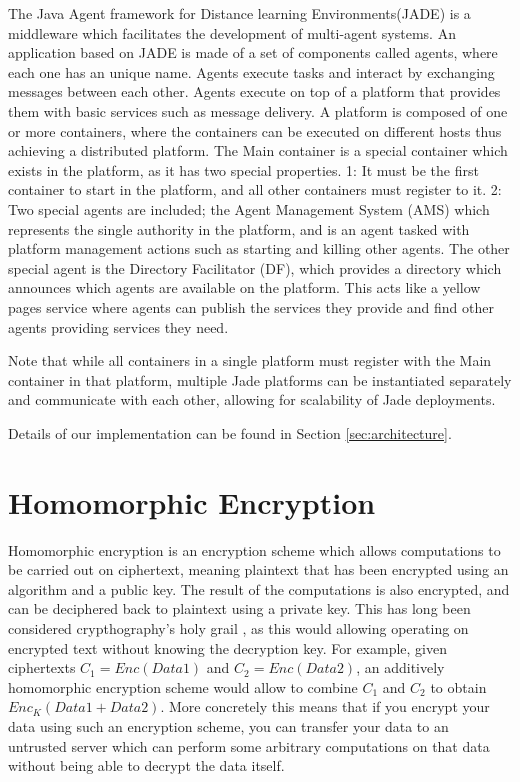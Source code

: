 The Java Agent framework for Distance learning Environments(JADE) is a middleware which facilitates the development of multi-agent systems. An application based on JADE is made of a set of components called agents, where each one has an unique name. Agents execute tasks and interact by exchanging messages between each other. Agents execute on top of a platform that provides them with basic services such as message delivery. A platform is composed of one or more containers, where the containers can be executed on different hosts thus achieving a distributed platform. The Main container is a special container which exists in the platform, as it has two special properties. 1: It must be the first container to start in the platform, and all other containers must register to it. 2: Two special agents are included; the Agent Management System (AMS) which represents the single authority in the platform, and is an agent tasked with platform management actions such as starting and killing other agents. The other special agent is the Directory Facilitator (DF), which provides a directory which announces which agents are available on the platform. This acts like a yellow pages service where agents can publish the services they provide and find other agents providing services they need.

 Note that while all containers in a single platform must register with the Main container in that platform, multiple Jade platforms can be instantiated separately and communicate with each other, allowing for scalability of Jade deployments.
 

Details of our implementation can be found in Section \ref{sec:architecture}.

\section{Homomorphic Encryption}\label{sec:homomorphic_encryption}
Homomorphic encryption is an encryption scheme which allows computations to be carried out on ciphertext, meaning plaintext that has been encrypted using an algorithm and a public key. The result of the computations is also encrypted, and can be deciphered back to plaintext using a private key. This has long been considered crypthography's holy grail \citep{Micciancio2011HomoEnc}, as this would allowing operating on encrypted text without knowing the decryption key. For example, given ciphertexts $C_1=Enc(Data1)$ and $C_2=Enc(Data2)$, an additively homomorphic encryption scheme would allow to combine $C_1$ and $C_2$ to obtain $Enc_K(Data1+Data2)$. More concretely this means that if you encrypt your data using such an encryption scheme, you can transfer your data to an untrusted server which can perform some arbitrary computations on that data without being able to decrypt the data itself.

